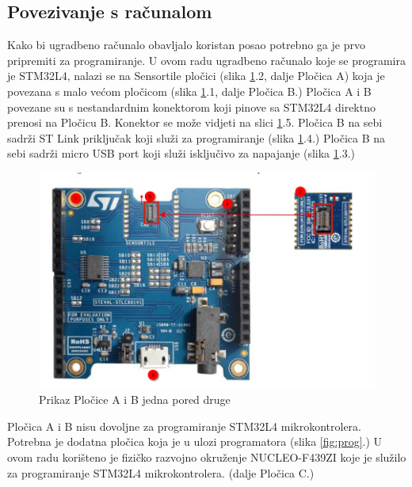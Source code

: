 \documentclass[times, utf8, diplomski]{diplomski}
\begin{document}
\subsection{Povezivanje s računalom}
Kako bi ugradbeno računalo obavljalo koristan posao potrebno ga je prvo pripremiti za programiranje.
U ovom radu ugradbeno računalo koje se programira je STM32L4, nalazi se na Sensortile pločici (slika \ref{fig:plocab}.2, dalje Pločica A) koja je povezana s malo većom pločicom (slika \ref{fig:plocab}.1, dalje Pločica B.)
Pločica A i B povezane su s nestandardnim konektorom koji pinove sa STM32L4 direktno prenosi na Pločicu B.
Konektor se može vidjeti na slici \ref{fig:plocab}.5.
Pločica B na sebi sadrži ST Link \cite{stlink} priključak koji služi za programiranje (slika \ref{fig:plocab}.4.)
Pločica B na sebi sadrži micro USB port koji služi isključivo za napajanje (slika \ref{fig:plocab}.3.)

\begin{figure}[H]
\includegraphics[scale=0.5]{PlocicaAiB.png}
\centering
\caption{Prikaz Pločice A i B jedna pored druge \cite{gettingstartedsensor}}
\label{fig:plocab}
\end{figure}

Pločica A i B nisu dovoljne za programiranje STM32L4 mikrokontrolera. Potrebna je dodatna pločica koja je u ulozi programatora (slika \ref{fig:prog}.) U ovom radu korišteno je fizičko razvojno okruženje NUCLEO-F439ZI koje je služilo za programiranje STM32L4 mikrokontrolera.
(dalje Pločica C.)
\end{document}
